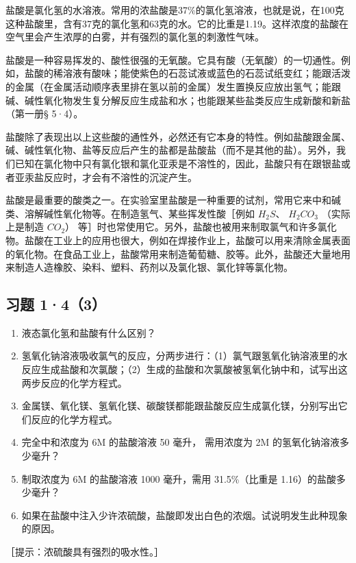 盐酸是氯化氢的水溶液。常用的浓盐酸是37\%的氯化氢溶液，也就是说，在100克这种盐酸里，含有37克的氯化氢和63克的水。它的比重是1.19。这样浓度的盐酸在空气里会产生浓厚的白雾，并有强烈的氯化氢的刺激性气味。

盐酸是一种容易挥发的、酸性很强的无氧酸。它具有酸（无氧酸）的一切通性。例如，盐酸的稀溶液有酸味；能使紫色的石蕊试液或蓝色的石蕊试纸变红；能跟活泼的金属（在金属活动顺序表里排在氢以前的金属）发生置换反应放出氢气；能跟碱、碱性氧化物发生复分解反应生成盐和水；也能跟某些盐类反应生成新酸和新盐（第一册§
5·4）。

盐酸除了表现出以上这些酸的通性外，必然还有它本身的特性。例如盐酸跟金属、碱、碱性氧化物、盐等反应后产生的盐都是盐酸盐（而不是其他的盐）。另外，我们已知在氯化物中只有氯化银和氯化亚汞是不溶性的，因此，盐酸只有在跟银盐或者亚汞盐反应时，才会有不溶性的沉淀产生。

盐酸是最重要的酸类之一。在实验室里盐酸是一种重要的试剂，常用它来中和碱类、溶解碱性氧化物等。在制造氢气、某些挥发性酸［例如
\(H_{2}S\)、 \(H_{2}CO_{3}\) （实际上是制造 \(CO_{2}\)）
等］时也常使用它。另外，盐酸也被用来制取氯气和许多氯化物。盐酸在工业上的应用也很大，例如在焊接作业上，盐酸可以用来清除金属表面的氧化物。在食品工业上，盐酸常用来制造葡萄糖、胶等。此外，盐酸还大量地用来制造人造橡胶、染料、塑料、药剂以及氯化银、氯化锌等氯化物。

\subsection{习题 1·4（3）}

\begin{enumerate}
\item
  液态氯化氢和盐酸有什么区别？
\item
  氢氧化钠溶液吸收氯气的反应，分两步进行：（1）氯气跟氢氧化钠溶液里的水反应生成盐酸和次氯酸；（2）生成的盐酸和次氯酸被氢氧化钠中和，试写出这两步反应的化学方程式。
\item
  金属镁、氧化镁、氢氧化镁、碳酸镁都能跟盐酸反应生成氯化镁，分别写出它们反应的化学方程式。
\item
  完全中和浓度为 6M 的盐酸溶液 50 毫升， 需用浓度为 2M
  的氢氧化钠溶液多少毫升？
\item
  制取浓度为 6M 的盐酸溶液 1000 毫升，需用 31.5\%（比重是
  1.16）的盐酸多少毫升？
\item
  如果在盐酸中注入少许浓硫酸，盐酸即发出白色的浓烟。试说明发生此种现象的原因。
\end{enumerate}

［提示：浓硫酸具有强烈的吸水性。］


